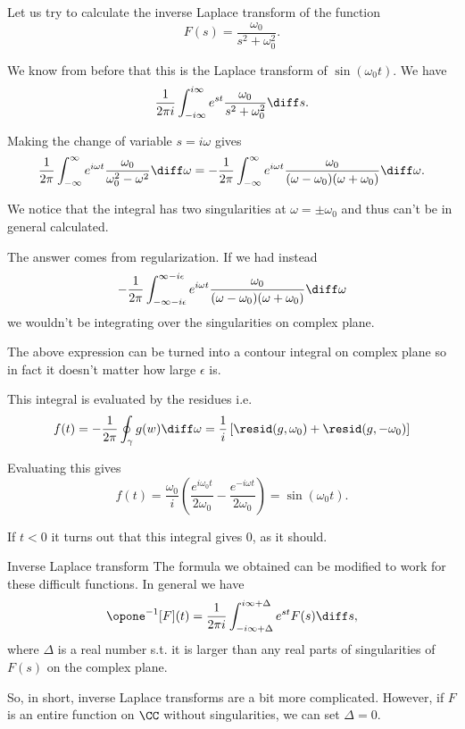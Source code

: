 \begin{frame}
	Let us try to calculate the inverse Laplace transform of the function
	\[ F(s) = \frac{\omega_0}{s^2 + \omega_0^2}. \]
	
	\pause
	We know from before that this is the Laplace transform of $ \sin (\omega_0 t) $. We have
	\[ \frac{1}{2\pi i} \int_{-i\infty}^{i\infty} e^{st}\frac{\omega_0}{s^2 + \omega_0^2} \diff s.   \]
	
	\pause
	Making the change of variable $ s = i \omega $ gives
	\[ \frac{1}{2\pi} \int_{-\infty}^{\infty} e^{i \omega t} \frac{\omega_0}{\omega_0^2 - \omega^2} \diff \omega = -\frac{1}{2\pi} \int_{-\infty}^{\infty} e^{i \omega t} \frac{\omega_0}{(\omega - \omega_0)(\omega + \omega_0)} \diff \omega. \]
	
	\pause
	We notice that the integral has two singularities at $ \omega = \pm \omega_0 $ and thus can't be in general calculated.
\end{frame}

\begin{frame}
	The answer comes from regularization. If we had instead
	\[ -\frac{1}{2\pi} \int_{-\infty-i\epsilon}^{\infty-i\epsilon} e^{i \omega t} \frac{\omega_0}{(\omega - \omega_0)(\omega + \omega_0)} \diff \omega \]
	we wouldn't be integrating over the singularities on complex plane.
	
	\pause
	The above expression can be turned into a contour integral on complex plane so in fact it doesn't matter how large $ \epsilon $ is. 
	
	\pause
	This integral is evaluated by the residues i.e.
	\[ f(t) =  -\frac{1}{2\pi} \oint_\gamma g(w) \diff \omega 
	= \frac{1}{i} \left[ \resid(g,\omega_0) + \resid(g,-\omega_0)  \right]  \]
	
	\pause
	Evaluating this gives
	\[ f(t) = \frac{\omega_0}{i} \left(\frac{e^{i\omega_0 t}}{2\omega_0} - \frac{e^{-i\omega t}}{2\omega_0}   \right)  = \sin(\omega_0 t).\]
	
	If $ t<0 $ it turns out that this integral gives 0, as it should.
\end{frame}

\begin{frame}{Inverse Laplace transform}
	The formula we obtained can be modified to work for these difficult functions. In general we have 
	\[ \opone^{-1} [F](t) = \frac{1}{2\pi i} \int_{-i\infty + \Delta}^{i\infty + \Delta} e^{st} F(s) \diff s, \]
	where $ \Delta $ is a real number s.t. it is larger than any real parts of singularities of $ F(s)  $ on the complex plane. 
	
	\pause
	So, in short, inverse Laplace transforms are a bit more complicated. However, if $ F $ is an entire function on $ \CC $ without singularities, we can set $ \Delta =0 $. 
\end{frame}

